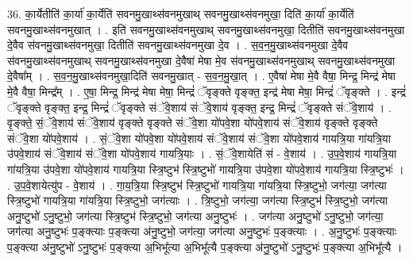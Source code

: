 \documentclass[17pt]{extarticle}
\begin{document}
36. का॒र्येतीति॑ का॒र्या॑ का॒र्येति॑ सवनमु॒खाथ्स॑वनमुखाथ् सवनमु॒खाथ्स॑वनमुखा॒ दिति॑ का॒र्या॑ का॒र्येति॑ सवनमु॒खाथ्स॑वनमुखात् । . इति॑ सवनमु॒खाथ्स॑वनमुखाथ् सवनमु॒खाथ्स॑वनमुखा॒ दितीति॑ सवनमु॒खाथ्स॑वनमुखा दे॒वैव स॑वनमु॒खाथ्स॑वनमुखा॒ दितीति॑ सवनमु॒खाथ्स॑वनमुखा दे॒व । . स॒व॒न॒मु॒खाथ्स॑वनमुखा दे॒वैव स॑वनमु॒खाथ्स॑वनमुखाथ् सवनमु॒खाथ्स॑वनमुखा दे॒वैषा॑ मेषा मे॒व स॑वनमु॒खाथ्स॑वनमुखाथ् सवनमु॒खाथ्स॑वनमुखा दे॒वैषा᳚म् । . स॒व॒न॒मु॒खाथ्स॑वनमुखा॒दिति॑ सवनमु॒खात् - स॒व॒न॒मु॒खा॒त् । . ए॒वैषा॑ मेषा मे॒वै वैषा॒ मिन्द्र॒ मिन्द्र॑ मेषा मे॒वै वैषा॒ मिन्द्र᳚म् । . ए॒षा॒ मिन्द्र॒ मिन्द्र॑ मेषा मेषा॒ मिन्द्रं॑ ॅवृङ्क्ते वृङ्क्त॒ इन्द्र॑ मेषा मेषा॒ मिन्द्रं॑ ॅवृङ्क्ते । . इन्द्रं॑ ॅवृङ्क्ते वृङ्क्त॒ इन्द्र॒ मिन्द्रं॑ ॅवृङ्क्ते संॅवे॒शाय॑ संॅवे॒शाय॑ वृङ्क्त॒ इन्द्र॒ मिन्द्रं॑ ॅवृङ्क्ते संॅवे॒शाय॑ । . वृ॒ङ्क्ते॒ सं॒ॅवे॒शाय॑ संॅवे॒शाय॑ वृङ्क्ते वृङ्क्ते संॅवे॒शा यो॑पवे॒शा यो॑पवे॒शाय॑ संॅवे॒शाय॑ वृङ्क्ते वृङ्क्ते संॅवे॒शा यो॑पवे॒शाय॑ । . सं॒ॅवे॒शा यो॑पवे॒शा यो॑पवे॒शाय॑ संॅवे॒शाय॑ संॅवे॒शा यो॑पवे॒शाय॑ गायत्रि॒या गा॑यत्रि॒या उ॑पवे॒शाय॑ संॅवे॒शाय॑ संॅवे॒शा यो॑पवे॒शाय॑ गायत्रि॒याः । . सं॒ॅवे॒शायेति॑ सं - वे॒शाय॑ । . उ॒प॒वे॒शाय॑ गायत्रि॒या गा॑यत्रि॒या उ॑पवे॒शा यो॑पवे॒शाय॑ गायत्रि॒या स्त्रि॒ष्टुभ॑ स्त्रि॒ष्टुभो॑ गायत्रि॒या उ॑पवे॒शा यो॑पवे॒शाय॑ गायत्रि॒या स्त्रि॒ष्टुभः॑ । . उ॒प॒वे॒शायेत्यु॑प - वे॒शाय॑ । . गा॒य॒त्रि॒या स्त्रि॒ष्टुभ॑ स्त्रि॒ष्टुभो॑ गायत्रि॒या गा॑यत्रि॒या स्त्रि॒ष्टुभो॒ जग॑त्या॒ जग॑त्या स्त्रि॒ष्टुभो॑ गायत्रि॒या गा॑यत्रि॒या स्त्रि॒ष्टुभो॒ जग॑त्याः । . त्रि॒ष्टुभो॒ जग॑त्या॒ जग॑त्या स्त्रि॒ष्टुभ॑ स्त्रि॒ष्टुभो॒ जग॑त्या अनु॒ष्टुभो॑ ऽनु॒ष्टुभो॒ जग॑त्या स्त्रि॒ष्टुभ॑ स्त्रि॒ष्टुभो॒ जग॑त्या अनु॒ष्टुभः॑ । . जग॑त्या अनु॒ष्टुभो॑ ऽनु॒ष्टुभो॒ जग॑त्या॒ जग॑त्या अनु॒ष्टुभः॑ प॒ङ्क्त्याः प॒ङ्क्त्या अ॑नु॒ष्टुभो॒ जग॑त्या॒ जग॑त्या अनु॒ष्टुभः॑ प॒ङ्क्त्याः । . अ॒नु॒ष्टुभः॑ प॒ङ्क्त्याः प॒ङ्क्त्या अ॑नु॒ष्टुभो॑ ऽनु॒ष्टुभः॑ प॒ङ्क्त्या अ॒भिभू᳚त्या अ॒भिभू᳚त्यै प॒ङ्क्त्या अ॑नु॒ष्टुभो॑ ऽनु॒ष्टुभः॑ प॒ङ्क्त्या अ॒भिभू᳚त्यै । \newline
\end{document}
